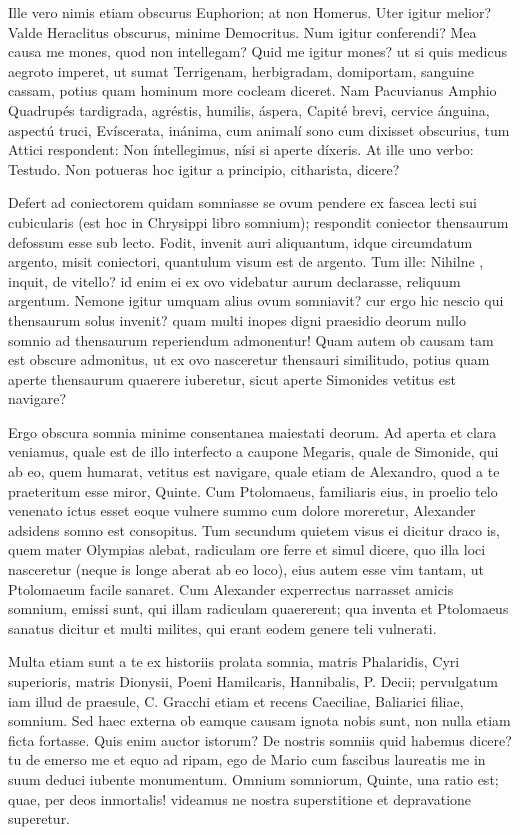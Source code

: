  Ille vero nimis etiam obscurus Euphorion; at non Homerus. Uter igitur melior? Valde Heraclitus obscurus, minime Democritus. Num igitur conferendi? Mea causa me mones, quod non intellegam? Quid me igitur mones? ut si quis medicus aegroto imperet, ut sumat Terrigenam, herbigradam, domiportam, sanguine cassam, potius quam hominum more cocleam diceret. Nam Pacuvianus Amphio Quadrupés tardigrada, agréstis, humilis, áspera, Capité brevi, cervice ánguina, aspectú truci, Evíscerata, inánima, cum animalí sono cum dixisset obscurius, tum Attici respondent: Non íntellegimus, nísi si aperte díxeris. At ille uno verbo: Testudo. Non potueras hoc igitur a principio, citharista, dicere?

 Defert ad coniectorem quidam somniasse se ovum pendere ex fascea lecti sui cubicularis (est hoc in Chrysippi libro somnium); respondit coniector thensaurum defossum esse sub lecto. Fodit, invenit auri aliquantum, idque circumdatum argento, misit coniectori, quantulum visum est de argento. Tum ille: Nihilne , inquit, de vitello? id enim ei ex ovo videbatur aurum declarasse, reliquum argentum. Nemone igitur umquam alius ovum somniavit? cur ergo hic nescio qui thensaurum solus invenit? quam multi inopes digni praesidio deorum nullo somnio ad thensaurum reperiendum admonentur! Quam autem ob causam tam est obscure admonitus, ut ex ovo nasceretur thensauri similitudo, potius quam aperte thensaurum quaerere iuberetur, sicut aperte Simonides vetitus est navigare?

 Ergo obscura somnia minime consentanea maiestati deorum. Ad aperta et clara veniamus, quale est de illo interfecto a caupone Megaris, quale de Simonide, qui ab eo, quem humarat, vetitus est navigare, quale etiam de Alexandro, quod a te praeteritum esse miror, Quinte. Cum Ptolomaeus, familiaris eius, in proelio telo venenato ictus esset eoque vulnere summo cum dolore moreretur, Alexander adsidens somno est consopitus. Tum secundum quietem visus ei dicitur draco is, quem mater Olympias alebat, radiculam ore ferre et simul dicere, quo illa loci nasceretur (neque is longe aberat ab eo loco), eius autem esse vim tantam, ut Ptolomaeum facile sanaret. Cum Alexander experrectus narrasset amicis somnium, emissi sunt, qui illam radiculam quaererent; qua inventa et Ptolomaeus sanatus dicitur et multi milites, qui erant eodem genere teli vulnerati.

 Multa etiam sunt a te ex historiis prolata somnia, matris Phalaridis, Cyri superioris, matris Dionysii, Poeni Hamilcaris, Hannibalis, P. Decii; pervulgatum iam illud de praesule, C. Gracchi etiam et recens Caeciliae, Baliarici filiae, somnium. Sed haec externa ob eamque causam ignota nobis sunt, non nulla etiam ficta fortasse. Quis enim auctor istorum? De nostris somniis quid habemus dicere? tu de emerso me et equo ad ripam, ego de Mario cum fascibus laureatis me in suum deduci iubente monumentum. Omnium somniorum, Quinte, una ratio est; quae, per deos inmortalis! videamus ne nostra superstitione et depravatione superetur.

